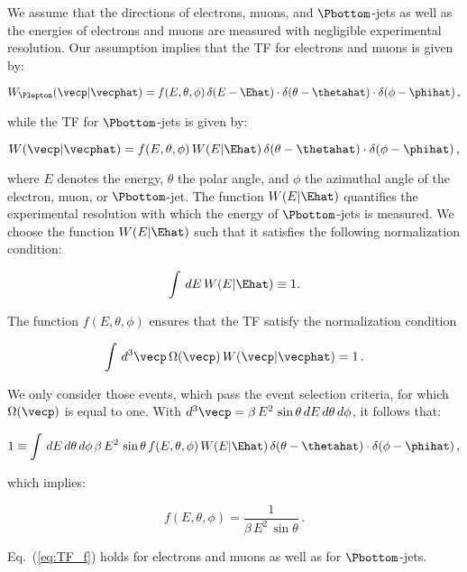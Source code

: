 We assume that the directions of electrons, muons, and $\Pbottom$-jets
as well as the energies of electrons and muons are measured with negligible experimental resolution.
Our assumption implies that the TF for electrons and muons is given by:
\begin{linenowrapper}
\begin{equation}
W_{\Plepton}(\vecp|\vecphat) = f(E,\theta,\phi) \, \delta(E - \Ehat) \cdot \delta(\theta - \thetahat) \cdot \delta(\phi - \phihat) \, ,
\label{eq:TF_ell}
\end{equation}
\end{linenowrapper}
while the TF for $\Pbottom$-jets is given by:
\begin{linenowrapper}
\begin{equation}
W(\vecp|\vecphat) = f(E,\theta,\phi) \, W(E|\Ehat) \, \delta(\theta - \thetahat) \cdot \delta(\phi - \phihat) \, ,
\label{eq:TF_b}
\end{equation}
\end{linenowrapper}
where $E$ denotes the energy, $\theta$ the polar angle, and $\phi$ the azimuthal angle of the electron, muon, or $\Pbottom$-jet.
The function $W(E|\Ehat)$ quantifies the experimental resolution with which the energy of $\Pbottom$-jets is measured.
We choose the function $W(E|\Ehat)$ such that it satisfies the following normalization condition:
\begin{linenowrapper}
\begin{equation*}
\int \, dE \, W(E|\Ehat) \equiv 1.
\end{equation*}
\end{linenowrapper}
The function $f(E,\theta,\phi)$ ensures that the TF satisfy the normalization condition 
\begin{linenowrapper}
\begin{equation*}
\int \, d^{3}\vecp \, \Omega(\vecp) \, W(\vecp|\vecphat) = 1 \, .
\end{equation*}
\end{linenowrapper}
We only consider those events, which pass the event selection criteria, \ie for which $\Omega(\vecp)$ is equal to one.
With $d^{3}\vecp = \beta \, E^{2} \, \sin\theta \, dE \, d\theta \, d\phi$, it follows that:
\begin{linenowrapper}
\begin{equation*}
1 \equiv \int \, dE \, d\theta \, d\phi \, \beta \, E^{2} \, \sin\theta \, f(E, \theta, \phi) \, W(E|\Ehat) \, \delta(\theta - \thetahat) \cdot \delta(\phi - \phihat) \, ,
\end{equation*}
\end{linenowrapper}
which implies:
\begin{linenowrapper}
\begin{equation}
f(E,\theta,\phi) = \frac{1}{\beta \, E^{2} \, \sin\theta} \, .
\label{eq:TF_f}
\end{equation}
\end{linenowrapper}
Eq.~(\ref{eq:TF_f}) holds for electrons and muons as well as for $\Pbottom$-jets.


